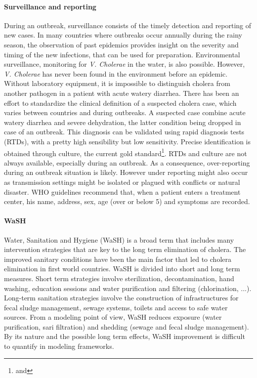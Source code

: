 \paragraph{Surveillance and reporting} During an outbreak, surveillance consists of the timely detection and reporting of new cases. In many countries where outbreaks occur annually during the rainy season, the observation of past epidemics provides insight on the severity and timing of the new infections, that can be used for preparation\cite{Baracchini:SeasonalityCholeraDynamics:2017}. Environmental surveillance, monitoring for \textit{V. Cholerae} in the water, is also possible. However, \textit{V. Cholerae} has never been found in the environment before an epidemic. 
Without laboratory equipment, it is impossible to distinguish cholera from another pathogen in a patient with acute watery diarrhea. There has been an effort to standardize the clinical definition of a suspected cholera case, which varies between countries and during outbreaks. A suspected case combine acute watery diarrhea and severe dehydration, the latter condition being dropped in case of an outbreak. This diagnosis can be validated using rapid diagnosis tests (RTDs), with a pretty high sensibility but low sensitivity. Precise identification is obtained through culture, the current gold standard\footnote{ and }. RTDs and culture are not always available, especially during an outbreak.  As a consequence, over-reporting during an outbreak situation is likely. However under reporting might also occur as transmission settings might be isolated or plagued with conflicts or natural disaster. WHO guidelines recommend that, when a patient enters a treatment center, his name, address, sex, age (over or below 5) and symptoms are recorded\cite{WHO:FirstStepsManaging:2010}. %

\paragraph{WaSH} Water, Sanitation and Hygiene (WaSH) is a broad term that includes many intervention strategies that are key to the long term elimination of cholera. The improved sanitary conditions have been the main factor that led to cholera elimination in first world countries. WaSH is divided into short and long term measures. Short term strategies involve sterilization, decontamination, hand washing, education sessions and water purification and filtering (chlorination, ...)\cite{Rebaudet:NationalAlertresponseStrategy:2018,Fewtrell:WaterSanitationHygiene:2005}. Long-term sanitation strategies involve the construction of infrastructures for fecal sludge management, sewage systems, toilets and access to safe water sources. From a modeling point of view, WaSH reduces exposure (water purification, sari filtration\cite{Colwell:ReductionCholeraBangladeshi:2003}) and shedding (sewage and fecal sludge management). By its nature and the possible long term effects, WaSH improvement is difficult to quantify in modeling frameworks.

